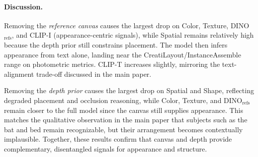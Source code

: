 \begin{table}[t]
  \centering
  \caption{Ablation study evaluating the contributions of the reference canvas and depth prior.
  The full model consistently achieves the best performance across identity preservation, spatial arrangement, and semantic alignment metrics.}
  \label{tab:ablation}
\end{table}

\paragraph{Discussion.}
Removing the \emph{reference canvas} causes the largest drop on Color, Texture, DINO$_{\text{refs}}$, and CLIP-I (appearance-centric signals), while Spatial remains relatively high because the depth prior still constrains placement.
The model then infers appearance from text alone, landing near the CreatiLayout/InstanceAssemble~\cite{tang2024creatilayout,xiang2025instanceassemble} range on photometric metrics.
CLIP-T increases slightly, mirroring the text-alignment trade-off discussed in the main paper.

Removing the \emph{depth prior} causes the largest drop on Spatial and Shape, reflecting degraded placement and occlusion reasoning, while Color, Texture, and DINO$_{\text{refs}}$ remain closer to the full model since the canvas still supplies appearance.
This matches the qualitative observation in the main paper that subjects such as the bat and bed remain recognizable, but their arrangement becomes contextually implausible.
Together, these results confirm that canvas and depth provide complementary, disentangled signals for appearance and structure.

